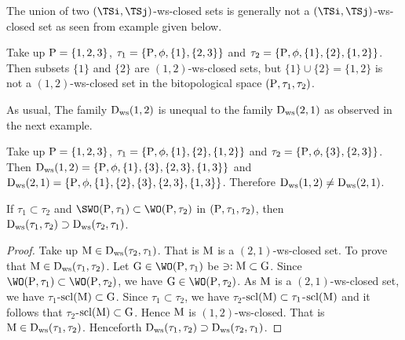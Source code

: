 \begin{rem}\label{rem7.2.25}
The union of two $(\TSi, \TSj)$-ws-closed sets is generally not a $(\TSi, \TSj)$-ws-closed set as seen from example given below.
\end{rem}

\begin{exm}\label{exm7. 2.26}
Take up $\mathrm{P}=\{1,2,3\}$, $\tau_1 =\{\mathrm{P}, \phi, \{1\},\{2, 3\}\}$ and $\tau_2 =\{\mathrm{P}, \phi, \{1\}, \{2\}, \{1, 2\}\}$. Then subsets $\{1\}$ and $\{2\}$ are $(1, 2)$-ws-closed sets, but $\{1\}\cup \{2\}=\{1,2\}$ is not a $(1, 2)$-ws-closed set in the bitopological space $(\mathrm{P}, \tau_1 , \tau_2 )$.
\end{exm}

\begin{rem}\label{rem7.2.27} 
As usual, The family $\mathrm{D}_{\mathrm{ws}} (1, 2)$ is unequal to the family $\mathrm{D}_{\mathrm{ws}} (2, 1)$ as observed in the next example.
\end{rem}

\begin{exm}\label{exm7.2.28}
Take up $\mathrm{P}= \{1,2,3\}$, $\tau_1 =\{\mathrm{P}, \phi, \{1\}, \{2\}, \{1, 2\}\}$ and $\tau_2 =\{\mathrm{P}, \phi, \{3\}, \{2, 3\}\}$. Then $\mathrm{D}_{\mathrm{ws}}(1, 2)=\{\mathrm{P}, \phi, \{1\}, \{3\},\{2,3\},\{1,3\}\}$ and $\mathrm{D}_{\mathrm{ws}} (2, 1)=\{\mathrm{P}, \phi, \{1\}, \{2\}, \{3\},\{2, 3\}, \{1,3\}\}$. Therefore $\mathrm{D}_{\mathrm{ws}} (1, 2)\neq \mathrm{D}_{\mathrm{ws}} (2, 1)$.
\end{exm}

\begin{thm}\label{thm7.2.29}
If $\tau_1 \subset \tau_2$ and $\SWO(\TSP, \tau_1) \subset \WO(\TSP, \tau_2 )$ in $(\mathrm{P}, \tau_1 , \tau_2 )$, then $\mathrm{D}_{\mathrm{ws}} (\tau_1 , \tau_2 ) \supset  \mathrm{D}_{\mathrm{ws}} (\tau_2 ,\tau_1 )$.
\end{thm}

\begin{proof}
Take up $\mathrm{M}\in \mathrm{D}_{\mathrm{ws}} (\tau_2 , \tau_1 )$. That is $\mathrm{M}$ is a $(2, 1)$-ws-closed set. To prove that $\mathrm{M}\in \mathrm{D}_{\mathrm{ws}} (\tau_1 ,\tau_2 )$. Let $\TSG\in \WO(\TSP, \tau_1 )$ be $\ni: \mathrm{M} \subset \mathrm{G}$. Since $\WO(\TSP, \tau_1 ) \subset \WO(\TSP, \tau_2 )$, we have $\TSG\in \WO(\TSP, \tau_2 )$. As $\mathrm{M}$ is a $(2, 1)$-ws-closed set, we have $\tau_1$-$\mathrm{scl}(\mathrm{M}) \subset \mathrm{G}$. Since $\tau_1 \subset \tau_2$, we have $\tau_2$-$\mathrm{scl}(\mathrm{M}) \subset \tau_1$-$\mathrm{scl}(\mathrm{M})$ and it follows that $\tau_2$-$\mathrm{scl}(\mathrm{M}) \subset \mathrm{G}$. Hence $\mathrm{M}$ is $(1, 2)$-ws-closed. That is $\mathrm{M} \in \mathrm{D}_{\mathrm{ws}} (\tau_1 , \tau_2 )$. Henceforth $\mathrm{D}_{\mathrm{ws}} (\tau_1 , \tau_2 ) \supset  \mathrm{D}_{\mathrm{ws}} (\tau_2 , \tau_1 )$.
\end{proof}

